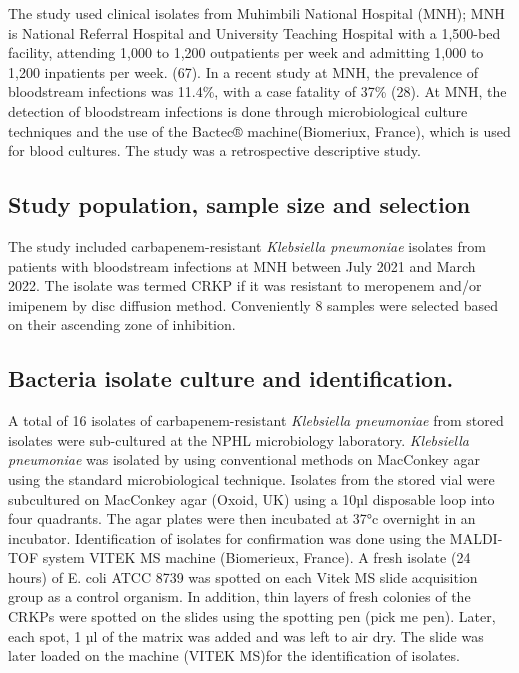 \documentclass[preprint, 3p,
authoryear]{elsarticle} %
\begin{document}
The study used clinical isolates from Muhimbili National Hospital (MNH);
MNH is National Referral Hospital and University Teaching Hospital with
a 1,500-bed facility, attending 1,000 to 1,200 outpatients per week and
admitting 1,000 to 1,200 inpatients per week. (67). In a recent study at
MNH, the prevalence of bloodstream infections was 11.4\%, with a case
fatality of 37\% (28). At MNH, the detection of bloodstream infections
is done through microbiological culture techniques and the use of the
Bactec® machine(Biomeriux, France), which is used for blood cultures.
The study was a retrospective descriptive study.

\subsection{Study population, sample size and
selection}\label{study-population-sample-size-and-selection}

The study included carbapenem-resistant \emph{Klebsiella pneumoniae}
isolates from patients with bloodstream infections at MNH between July
2021 and March 2022. The isolate was termed CRKP if it was resistant to
meropenem and/or imipenem by disc diffusion method. Conveniently 8
samples were selected based on their ascending zone of inhibition.

\subsection{Bacteria isolate culture and
identification.}\label{bacteria-isolate-culture-and-identification.}

A total of 16 isolates of carbapenem-resistant \emph{Klebsiella
pneumoniae} from stored isolates were sub-cultured at the NPHL
microbiology laboratory. \emph{Klebsiella pneumoniae} was isolated by
using conventional methods on MacConkey agar using the standard
microbiological technique. Isolates from the stored vial were
subcultured on MacConkey agar (Oxoid, UK) using a 10µl disposable loop
into four quadrants. The agar plates were then incubated at 37°c
overnight in an incubator. Identification of isolates for confirmation
was done using the MALDI-TOF system VITEK MS machine (Biomerieux,
France). A fresh isolate (24 hours) of E. coli ATCC 8739 was spotted on
each Vitek MS slide acquisition group as a control organism. In
addition, thin layers of fresh colonies of the CRKPs were spotted on the
slides using the spotting pen (pick me pen). Later, each spot, 1 µl of
the matrix was added and was left to air dry. The slide was later loaded
on the machine (VITEK MS)for the identification of isolates.
\end{document}
